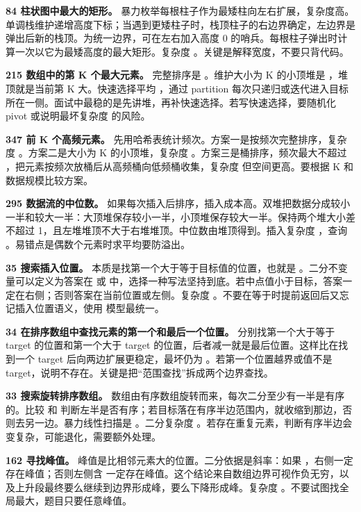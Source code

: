 \textbf{84 柱状图中最大的矩形。} 暴力枚举每根柱子作为最矮柱向左右扩展，复杂度高。单调栈维护递增高度下标；当遇到更矮柱子时，栈顶柱子的右边界确定，左边界是弹出后新的栈顶。为统一边界，可在左右加入高度 0 的哨兵。每根柱子弹出时计算一次以它为最矮高度的最大矩形。复杂度 。关键是解释宽度，不要只背代码。

\textbf{215 数组中的第 K 个最大元素。} 完整排序是 。维护大小为 K 的小顶堆是 ，堆顶就是当前第 K 大。快速选择平均 ，通过 partition 每次只递归或迭代进入目标所在一侧。面试中最稳的是先讲堆，再补快速选择。若写快速选择，要随机化 pivot 或说明最坏复杂度  的风险。

\textbf{347 前 K 个高频元素。} 先用哈希表统计频次。方案一是按频次完整排序，复杂度 。方案二是大小为 K 的小顶堆，复杂度 。方案三是桶排序，频次最大不超过 ，把元素按频次放桶后从高频桶向低频桶收集，复杂度  但空间更高。要根据 K 和数据规模比较方案。

\textbf{295 数据流的中位数。} 如果每次插入后排序，插入成本高。双堆把数据分成较小一半和较大一半：大顶堆保存较小一半，小顶堆保存较大一半。保持两个堆大小差不超过 1，且左堆堆顶不大于右堆堆顶。中位数由堆顶得到。插入复杂度 ，查询 。易错点是偶数个元素时求平均要防溢出。

\textbf{35 搜索插入位置。} 本质是找第一个大于等于目标值的位置，也就是 。二分不变量可以定义为答案在  或 \code{[left, right)} 中，选择一种写法坚持到底。若中点值小于目标，答案一定在右侧；否则答案在当前位置或左侧。复杂度 。不要在等于时提前返回后又忘记插入位置语义，使用  模型最统一。

\textbf{34 在排序数组中查找元素的第一个和最后一个位置。} 分别找第一个大于等于 target 的位置和第一个大于 target 的位置，后者减一就是最后位置。这样比在找到一个 target 后向两边扩展更稳定，最坏仍为 。若第一个位置越界或值不是 target，说明不存在。关键是把“范围查找”拆成两个边界查找。

\textbf{33 搜索旋转排序数组。} 数组由有序数组旋转而来，每次二分至少有一半是有序的。比较  和  判断左半是否有序；若目标落在有序半边范围内，就收缩到那边，否则去另一边。暴力线性扫描是 。二分复杂度 。若存在重复元素，判断有序半边会变复杂，可能退化，需要额外处理。

\textbf{162 寻找峰值。} 峰值是比相邻元素大的位置。二分依据是斜率：如果 ，右侧一定存在峰值；否则左侧含  一定存在峰值。这个结论来自数组边界可视作负无穷，以及上升段最终要么继续到边界形成峰，要么下降形成峰。复杂度 。不要试图找全局最大，题目只要任意峰值。

